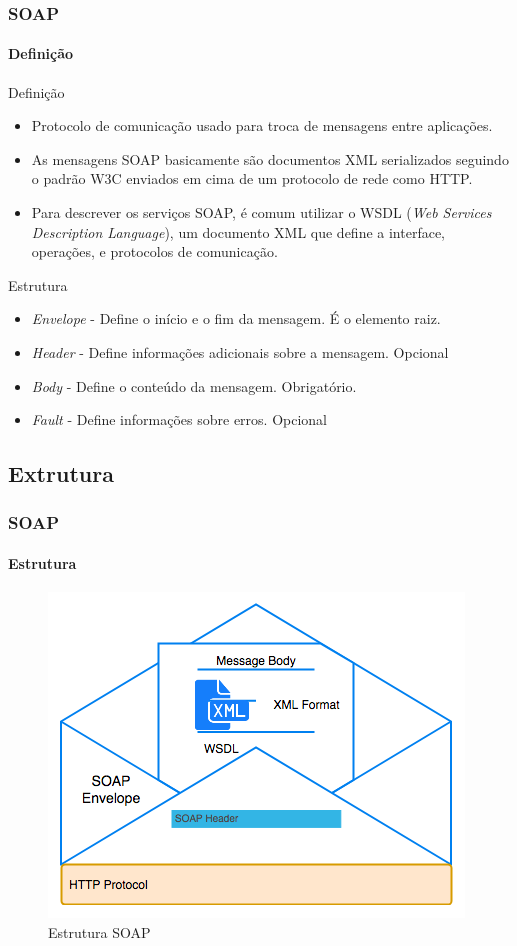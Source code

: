 \documentclass[
	9pt, %
	t, %
]{beamer}
\begin{document}
\begin{frame}
	\frametitle{SOAP}
	\framesubtitle{Definição}
	
	\begin{block}{Definição}
		\begin{itemize}
			\item Protocolo de comunicação usado para troca de mensagens entre aplicações.
			\item As mensagens SOAP basicamente são \alert{documentos XML} serializados seguindo o padrão W3C enviados em cima de um protocolo de rede como HTTP.
			\item Para descrever os serviços SOAP, é comum utilizar o WSDL (\textit{Web Services Description Language}), um documento XML que define a interface, operações, e protocolos de comunicação.
		\end{itemize}
	\end{block}

	\begin{exampleblock}{Estrutura}
		\begin{itemize}
			\item \textit{Envelope} - Define o início e o fim da mensagem. É o elemento raiz.
			\item \textit{Header} - Define informações adicionais sobre a mensagem. Opcional
			\item \textit{Body} - Define o conteúdo da mensagem. Obrigatório.
			\item \textit{Fault} - Define informações sobre erros. Opcional
		\end{itemize}
	\end{exampleblock}

\end{frame}

\subsection{Extrutura}

\begin{frame}
	\frametitle{SOAP}
	\framesubtitle{Estrutura}
	
	\begin{figure}
		\centering
		\includegraphics[width=0.7\linewidth]{soap_structure.png}
		\caption{Estrutura SOAP}
		\label{fig:soap}
	\end{figure}

\end{frame}
\end{document}
